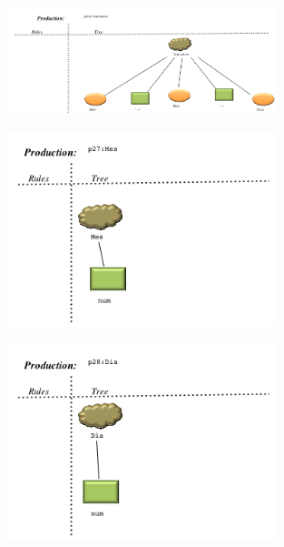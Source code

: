 \begin{figure}[!htb]
  \centering
    \includegraphics[width=0.7\textwidth]{./imagens/VisualLisa/__p26_DataDev.png}
\end{figure}
\begin{figure}[!htb]
  \centering
    \includegraphics[width=0.7\textwidth]{./imagens/VisualLisa/__p27_Mes.png}
\end{figure}
\begin{figure}[!htb]
  \centering
    \includegraphics[width=0.7\textwidth]{./imagens/VisualLisa/__p28_Dia.png}
\end{figure}




